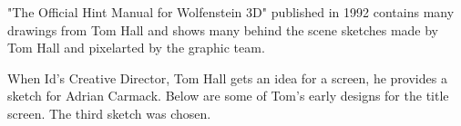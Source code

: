 \documentclass[book.tex]{subfiles}
\begin{document}
\begin{minipage}{0.7\textwidth}
"The Official Hint Manual for Wolfenstein 3D" published in 1992 contains many drawings from Tom Hall and shows many behind the scene sketches made by Tom Hall and pixelarted by the graphic team.\\
\par
 \begin{fancyquotes}
When Id's Creative Director, Tom Hall gets an idea for a screen, he provides a sketch for Adrian Carmack. Below are some of Tom's early designs for the title screen. The third sketch was chosen.\\
\end{fancyquotes}
\end{minipage}
\begin{minipage}{0.3\textwidth}
\begin{flushright}
\end{flushright}
\end{minipage}

\noindent
   \begin{figure}[H]
\centering
 \end{figure}
 \par
   \begin{figure}[H]
\centering
\end{figure} 




\begin{figure}[H]
\centering    
   \end{figure}



     \begin{figure}[H]
\centering
   \end{figure}
 
  \begin{figure}[H]
\centering
 \\
 \end{figure}



     \begin{figure}[H]
\centering
   \end{figure}
\end{document}
